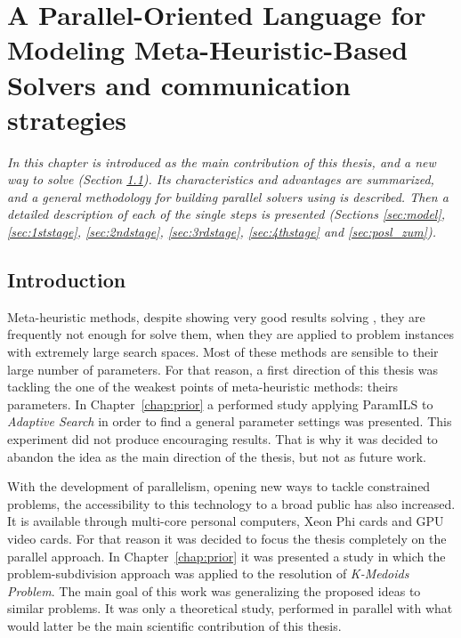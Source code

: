 \chapter{A Parallel-Oriented Language for Modeling Meta-Heuristic-Based Solvers and communication strategies}
\label{chap:posl}
\textit{In this chapter \posl{} is introduced as the main contribution of this thesis, and a new way to solve \csps{} (Section \ref{sec:posl_intro}). Its characteristics and advantages are summarized, and a general methodology for building parallel solvers using \posl{} is described. Then a detailed description of each of the single steps is presented (Sections \ref{sec:model}, \ref{sec:1ststage}, \ref{sec:2ndstage}, \ref{sec:3rdstage}, \ref{sec:4thstage} and \ref{sec:posl_zum}).}
\vfill
\minitoc
\newpage

\section{Introduction}
\label{sec:posl_intro}

Meta-heuristic methods, despite showing very good results solving \CSPs, they are frequently not enough for solve them, when they are applied to problem instances with extremely large search spaces. Most of these methods are sensible to their large number of parameters. For that reason, a first direction of this thesis was tackling the one of the weakest points of meta-heuristic methods: theirs parameters. In Chapter~\ref{chap:prior} a performed study applying {\sc ParamILS} to {\it Adaptive Search} in order to find a general parameter settings was presented. This experiment did not produce encouraging results. That is why it was decided to abandon the idea as the main direction of the thesis, but not as future work.

With the development of parallelism, opening new ways to tackle constrained problems, the accessibility to this technology to a broad public has also increased. It is available through multi-core personal computers, Xeon Phi cards and GPU video cards. For that reason it was decided to focus the thesis completely on the parallel approach. In Chapter~\ref{chap:prior} it was presented a study in which the problem-subdivision approach was applied to the resolution of {\it K-Medoids Problem}. The main goal of this work was generalizing the proposed ideas to similar problems. It was only a theoretical study, performed in parallel with what would latter be the main scientific contribution of this thesis.

